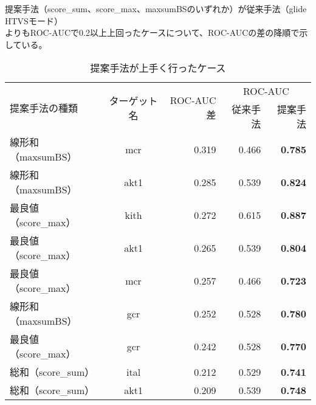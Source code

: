 \begin{table}[htb] \centering
	\caption{提案手法が上手く行ったケース}
	\label{table:target_accuracy_good}
	提案手法（score\_sum、score\_max、maxsumBSのいずれか）が従来手法（glide HTVSモード）\\
	よりもROC-AUCで0.2以上上回ったケースについて、ROC-AUCの差の降順で示している。
	\begin{tabular}{lc|r|rr}
	\hline
	\multirow{2}{*}{提案手法の種類}	&\multirow{2}{*}{ターゲット名}	&\multirow{2}{*}{ROC-AUC差}	&\multicolumn{2}{c}{ROC-AUC}	\\
								&						&							&従来手法	&提案手法		\\ \hline
	線形和（maxsumBS）			&mcr					&0.319						&0.466		&{\bf 0.785}		\\
	線形和（maxsumBS）			&akt1					&0.285						&0.539		&{\bf 0.824}		\\
	最良値（score\_max）			&kith					&0.272						&0.615		&{\bf 0.887}		\\
	最良値（score\_max）			&akt1					&0.265						&0.539		&{\bf 0.804}		\\
	最良値（score\_max）			&mcr					&0.257						&0.466		&{\bf 0.723}		\\
	線形和（maxsumBS）			&gcr						&0.252						&0.528		&{\bf 0.780}		\\
	最良値（score\_max）			&gcr						&0.242						&0.528		&{\bf 0.770}		\\
	総和（score\_sum）				&ital						&0.212						&0.529		&{\bf 0.741}		\\
	総和（score\_sum）				&akt1					&0.209						&0.539		&{\bf 0.748}		\\ \hline
	\end{tabular}
\end{table}
